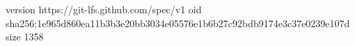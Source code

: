version https://git-lfs.github.com/spec/v1
oid sha256:1e965d860ea11b3b3e20bb3034e05576e1b6b27c92bdb9174e3c37e0239e107d
size 1358
